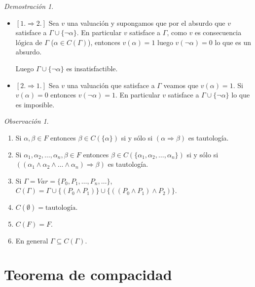 \documentclass[a4paper,11pt]{article}
\theoremstyle{definition}
\theoremstyle{remark}
\newtheorem*{remk}{Observación}
\newtheorem*{demo}{Demostración}
\begin{document}
\begin{demo}
	\begin{itemize}
		\item $[1. \Rightarrow 2.]$ Sea $v$ una valuación y supongamos que por el absurdo
		que $v$ satisface a $\Gamma \cup \{\neg\alpha\}$. En particular $v$ satisface a $\Gamma$,
		como $v$ es consecuencia lógica de $\Gamma$ ($\alpha \in C(\Gamma)$), entonces
		$v(\alpha) = 1$ luego $v(\neg\alpha) = 0$ lo que es un absurdo.
		
		Luego $\Gamma \cup \{\neg\alpha\}$ es insatisfactible.
		
		\item $[2. \Rightarrow 1.]$ Sea $v$ una valuación que satisface a $\Gamma$ veamos
		que $v(\alpha) = 1$. Si $v(\alpha) = 0$ entonces $v(\neg\alpha) = 1$. En particular
		$v$ satisface a $\Gamma \cup \{\neg\alpha\}$ lo que es imposible.
	\end{itemize}
\end{demo}

\begin{remk}
	\begin{enumerate}
		\item Si $\alpha, \beta \in F$ entonces $\beta \in C(\{\alpha\})$ si y sólo si 
		$(\alpha \Rightarrow \beta)$ es tautología.
		
		\item Si $\alpha_1, \alpha_2, \dots, \alpha_n, \beta \in F$ entonces 
		$\beta \in C(\{\alpha_1, \alpha_2, \dots, \alpha_n\})$ si y sólo si 
		$((\alpha_1 \wedge \alpha_2 \wedge \dots \wedge \alpha_n) \Rightarrow \beta)$ es
		tautología.
		
		\item Si $\Gamma = Var = \{P_0, P_1, \dots, P_n, \dots\}$, $C(\Gamma) = \Gamma \cup 
		\{(P_0 \wedge P_1)\} \cup \{((P_0 \wedge P_1) \wedge P_2)\}$.
		
		\item $C(\emptyset) = \text{tautología}$.
		
		\item $C(F) = F$.
		
		\item En general $\Gamma \subseteq C(\Gamma)$.
	\end{enumerate}
\end{remk}

\section*{Teorema de compacidad}
\end{document}
